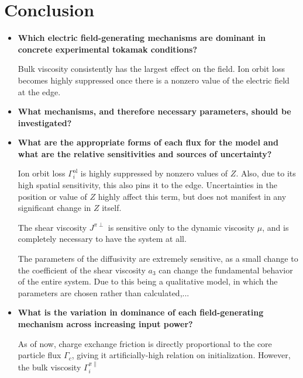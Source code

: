 \chapter{Conclusion}\label{chapter:conclusion}

\begin{itemize}
	\item \textbf{Which electric field-generating mechanisms are dominant in concrete experimental tokamak conditions?}

	Bulk viscosity consistently has the largest effect on the field.
	Ion orbit loss becomes highly suppressed once there is a nonzero value of the electric field at the edge.
\end{itemize}


\begin{itemize}
	\item \textbf{What mechanisms, and therefore necessary parameters, should be investigated?}
\end{itemize}


\begin{itemize}
	\item \textbf{What are the appropriate forms of each flux for the model and what are the relative sensitivities and sources of uncertainty?}

	Ion orbit loss $\Gamma_i^\text{ol}$ is highly suppressed by nonzero values of $Z$.
	Also, due to its high spatial sensitivity, this also pins it to the edge.
	Uncertainties in the position or value of $Z$ highly affect this term, but does not manifest in any significant change in $Z$ itself.

	The shear viscosity $J^{\pi\perp}$ is sensitive only to the dynamic viscosity $\mu$, and is completely necessary to have the system at all.

	The parameters of the diffusivity are extremely sensitive, as a small change to the coefficient of the shear viscosity $a_3$ can change the fundamental behavior of the entire system.
	Due to this being a qualitative model, in which the parameters are chosen rather than calculated,...
\end{itemize}


\begin{itemize}
	\item \textbf{What is the variation in dominance of each field-generating mechanism across increasing input power?}

	As of now, charge exchange friction is directly proportional to the core particle flux $\Gamma_c$, giving it artificially-high relation on initialization.
	However, the bulk viscosity $\Gamma_i^{\pi\parallel}$
\end{itemize}

